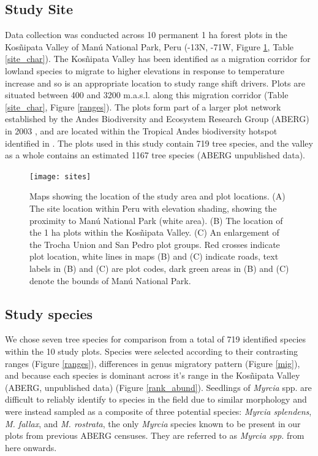 \documentclass[a4paper, 11pt]{article}
\begin{document}
\subsection{Study Site}
Data collection was conducted across 10 permanent 1 ha forest plots in the Kos\~{n}ipata Valley of Man\'{u} National Park, Peru (-13\textdegree N, -71\textdegree W, Figure \ref{sites}, Table \ref{site_char}). The Kos\~{n}ipata Valley has been identified as a migration corridor for lowland species to migrate to higher elevations in response to temperature increase \citep{Feeley2011} and so is an appropriate location to study range shift drivers. Plots are situated between 400 and 3200 m.a.s.l. along this migration corridor (Table \ref{site_char}, Figure \ref{ranges}). The plots form part of a larger plot network established by the Andes Biodiversity and Ecosystem Research Group (ABERG) in 2003 \citep{Malhi2010, Girardin2014}, and are located within the Tropical Andes biodiversity hotspot identified in \citet{Myers2000}. The plots used in this study contain 719 tree species, and the valley as a whole contains an estimated 1167 tree species (ABERG unpublished data).

\begin{figure}[H]
\texttt{[image: sites]}
\centering
\caption{Maps showing the location of the study area and plot locations. (A) The site location within Peru with elevation shading, showing the proximity to Man\'{u} National Park (white area). (B) The location of the 1 ha plots within the Kos\~{n}ipata Valley. (C) An enlargement of the Trocha Union and San Pedro plot groups. Red crosses indicate plot location, white lines in maps (B) and (C) indicate roads, text labels in (B) and (C) are plot codes, dark green areas in (B) and (C) denote the bounds of Man\'{u} National Park.}
\label{sites}
\end{figure}



\subsection{Study species} 
We chose seven tree species for comparison from a total of 719 identified species within the 10 study plots. Species were selected according to their contrasting ranges (Figure \ref{ranges}), differences in genus migratory pattern \citep{Feeley2011} (Figure \ref{mig}), and because each species is dominant across it's range in the Kos\~{n}ipata Valley (ABERG, unpublished data) (Figure \ref{rank_abund}). Seedlings of \textit{Myrcia} spp. are difficult to reliably identify to species in the field due to similar morphology and were instead sampled as a composite of three potential species: \textit{Myrcia splendens}, \textit{M. fallax}, and \textit{M. rostrata}, the only \textit{Myrcia} species known to be present in our plots from previous ABERG censuses. They are referred to as \textit{Myrcia spp.} from here onwards. 
\end{document}
